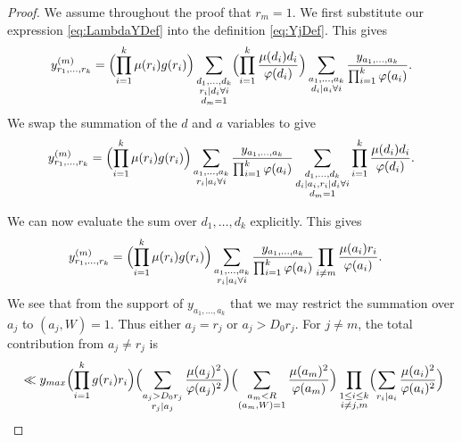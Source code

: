 \documentclass[12pt,a4paper]{amsart}
\theoremstyle{plain}
\numberwithin{sblmm}{thrm}
\numberwithin{equation}{section}
\renewcommand{\phi}{\varphi}
\begin{document}
\begin{proof}
We assume throughout the proof that $r_m=1$. We first substitute our expression \eqref{eq:LambdaYDef} into the definition \eqref{eq:YjDef}. This gives
\begin{equation}
y^{(m)}_{r_1,\dotsc,r_k}=\Bigl(\prod_{i=1}^k\mu(r_i)g(r_i)\Bigr)\sum_{\substack{d_1,\dotsc,d_k\\r_i|d_i\forall i\\d_m=1}}\Bigl(\prod_{i=1}^k\frac{\mu(d_i)d_i}{\phi(d_i)}\Bigr)\sum_{\substack{a_1,\dotsc,a_k\\d_i|a_i\forall i}}\frac{y_{a_1,\dotsc,a_k}}{\prod_{i=1}^k\phi(a_i)}.
\end{equation}
We swap the summation of the $d$ and $a$ variables to give
\begin{equation}
y^{(m)}_{r_1,\dotsc,r_k}=\Bigl(\prod_{i=1}^k\mu(r_i)g(r_i)\Bigr)\sum_{\substack{a_1,\dotsc,a_k\\r_i|a_i\forall i}}\frac{y_{a_1,\dotsc,a_k}}{\prod_{i=1}^k\phi(a_i)}\sum_{\substack{d_1,\dotsc, d_k\\ d_i|a_i, r_i|d_i\forall i\\ d_m=1}}\prod_{i=1}^k\frac{\mu(d_i)d_i}{\phi(d_i)}.
\end{equation}

We can now evaluate the sum over $d_1,\dotsc,d_k$ explicitly. This gives
\begin{align}
y^{(m)}_{r_1,\dotsc,r_k}&=\Bigl(\prod_{i=1}^k\mu(r_i)g(r_i)\Bigr)\sum_{\substack{a_1,\dotsc,a_k\\r_i|a_i\forall i}}\frac{y_{a_1,\dotsc,a_k}}{\prod_{i=1}^k\phi(a_i)}\prod_{i\ne m}\frac{\mu(a_i)r_i}{\phi(a_i)}.
\end{align}
We see that from the support of $y_{a_1,\dotsc,a_k}$ that we may restrict the summation over $a_j$ to $(a_j,W)=1$. Thus either $a_j=r_j$ or $a_j>D_0r_j$. For $j\ne m$, the total contribution from $a_{j}\ne r_{j}$ is
\begin{align}
&\ll y_{max}\Bigl(\prod_{i=1}^kg(r_i)r_i\Bigr) \Bigl(\sum_{\substack{a_{j}>D_0r_{j}\\ r_j|a_j}}\frac{\mu(a_{j})^2}{\phi(a_{j})^2}\Bigr)\Bigl(\sum_{\substack{a_m<R\\ (a_m,W)=1}}\frac{\mu(a_m)^2}{\phi(a_m)}\Bigr)\prod_{\substack{1\le i\le k\\ i\ne j,m}}\Bigl(\sum_{r_i|a_i}\frac{\mu(a_i)^2}{\phi(a_i)^2}\Bigr)\nonumber\\

\end{align}
\end{proof}
\end{document}
